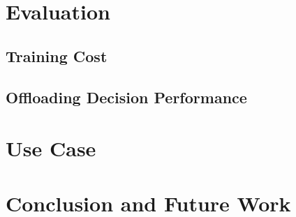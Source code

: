 \documentclass[10pt, conference, compsocconf]{IEEEtran}
\begin{document}
\section{Evaluation}
%
\subsection{Training Cost}
%
\subsection{Offloading Decision Performance}
%
\section{Use Case}
%
\section{Conclusion and Future Work}
% 
%
%
%

\end{document}
